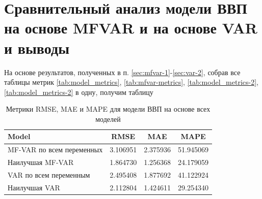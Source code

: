 \documentclass[a4paper, 14pt]{extreport}
\numberwithin{equation}{section}
\numberwithin{equation}{section}
\begin{document}
	\section{Сравнительный анализ модели ВВП на основе MFVAR и на основе VAR и выводы}
	
	На основе результатов, полученных в п. \ref{sec:mfvar-1}-\ref{sec:var-2}, собрав все таблицы метрик \ref{tab:model_metrics}, \ref{tab:mfvar-metrics}, \ref{tab:model_metrics-2}, \ref{tab:model_metrics-2} в одну, получим таблицу
	\begin{table}[h!]
		\centering
		\caption{Метрики RMSE, MAE и MAPE для модели ВВП на основе всех моделей}
		\begin{tabular}{lccc}
			\toprule
			\textbf{Model} & \textbf{RMSE} & \textbf{MAE} & \textbf{MAPE} \\ 
			\midrule
			MF-VAR по всем переменных & 3.106951 & 2.375936 & 51.945069 \\
			\midrule
			Наилучшая MF-VAR & 1.864730 & 1.256368 & 24.179059 \\  
			\midrule
			VAR по всем переменным & 2.495408 & 1.877692 & 41.122924 \\ 
			\midrule
			Наилучшая VAR & 2.112804 & 1.424611 & 29.254340 \\ 
			\bottomrule
		\end{tabular}
		\label{tab:metrics_summary}
	\end{table}
	
\end{document}
